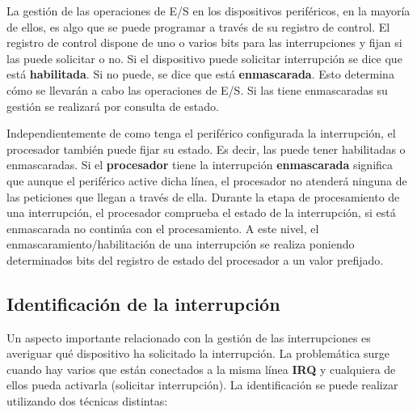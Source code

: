 La gestión de las operaciones de E/S en los dispositivos periféricos, en la mayoría de ellos, es algo que se puede programar a través de su registro de control.  El registro de control dispone de uno o varios bits para las interrupciones y fijan si las puede solicitar o no. Si el dispositivo puede solicitar interrupción se dice que está {\bf habilitada}. Si no puede, se dice que  está {\bf enmascarada}. Esto determina cómo se llevarán a cabo las operaciones de E/S. Si las tiene enmascaradas su gestión se realizará por consulta de estado.

Independientemente de como tenga el periférico configurada la interrupción, el procesador también puede fijar su estado. Es decir, las puede tener habilitadas o enmascaradas. Si el {\bf procesador} tiene la interrupción {\bf enmascarada} significa que aunque el periférico active dicha línea, el procesador no atenderá ninguna de las peticiones que llegan a través de ella. Durante la etapa de procesamiento de una interrupción,  el procesador comprueba el estado de la interrupción, si está enmascarada no continúa con el procesamiento.  
A este nivel, el enmascaramiento/habilitación de una interrupción se realiza poniendo determinados bits del registro de estado del procesador a un valor prefijado. 

\subsection{Identificación de la interrupción}
Un aspecto importante relacionado con la gestión de las interrupciones es averiguar qué dispositivo ha solicitado la interrupción. La problemática surge cuando hay varios  que están conectados a la misma línea  \textbf{IRQ} y cualquiera de ellos pueda activarla (solicitar interrupción). La identificación se puede realizar utilizando dos técnicas distintas:

